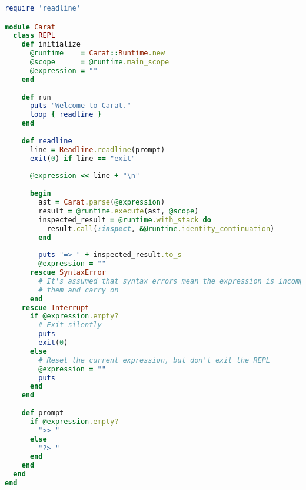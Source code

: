 \begin{lstlisting}[title={\small\Helvetica repl.rb},language=Ruby]
require 'readline'

module Carat
  class REPL
    def initialize
      @runtime    = Carat::Runtime.new
      @scope      = @runtime.main_scope
      @expression = ""
    end
    
    def run
      puts "Welcome to Carat."
      loop { readline }
    end
    
    def readline
      line = Readline.readline(prompt)
      exit(0) if line == "exit"
      
      @expression << line + "\n"
      
      begin
        ast = Carat.parse(@expression)
        result = @runtime.execute(ast, @scope)
        inspected_result = @runtime.with_stack do
          result.call(:inspect, &@runtime.identity_continuation)
        end
        
        puts "=> " + inspected_result.to_s
        @expression = ""
      rescue SyntaxError
        # It's assumed that syntax errors mean the expression is incomplete, so we just rescue
        # them and carry on
      end
    rescue Interrupt
      if @expression.empty?
        # Exit silently
        puts
        exit(0)
      else
        # Reset the current expression, but don't exit the REPL
        @expression = ""
        puts
      end
    end
    
    def prompt
      if @expression.empty?
        ">> "
      else
        "?> "
      end
    end
  end
end

\end{lstlisting}
